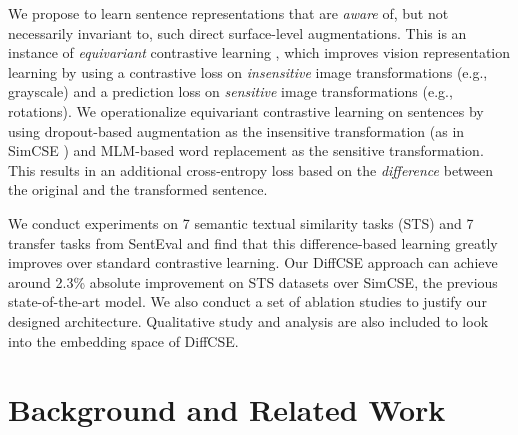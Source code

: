 \documentclass[11pt]{article}
\begin{document}
We propose to learn sentence representations that are \emph{aware} of, but not necessarily invariant to, such direct surface-level augmentations. This is an instance of \emph{equivariant} contrastive learning \cite{dangovski2021equivariant}, which improves vision representation learning by using a contrastive loss on  \emph{insensitive} image transformations (e.g., grayscale) and a prediction loss on \emph{sensitive} image transformations (e.g., rotations). We operationalize equivariant contrastive learning on sentences by using dropout-based augmentation as the insensitive transformation (as in SimCSE \cite{gao2021simcse}) and MLM-based word replacement as the sensitive transformation. This results in an additional cross-entropy loss based on the \emph{difference} between the original and the transformed sentence.


We conduct experiments on 7 semantic textual similarity tasks (STS) and 7 transfer tasks from SentEval \cite{conneau-kiela-2018-senteval} and find that this difference-based learning greatly improves over standard contrastive learning. Our DiffCSE approach can achieve around 2.3\% absolute improvement on STS datasets over SimCSE, the previous state-of-the-art model. We also conduct a set of ablation studies to justify our designed architecture. Qualitative study and analysis are also included to look into the embedding space of DiffCSE.



\section{Background and Related Work}
\end{document}
